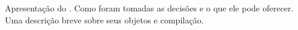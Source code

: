 %
%
%
Apresentação do \assunto. Como foram tomadas as decisões e o que ele pode oferecer. Uma descrição breve sobre seus objetos e compilação.
%

